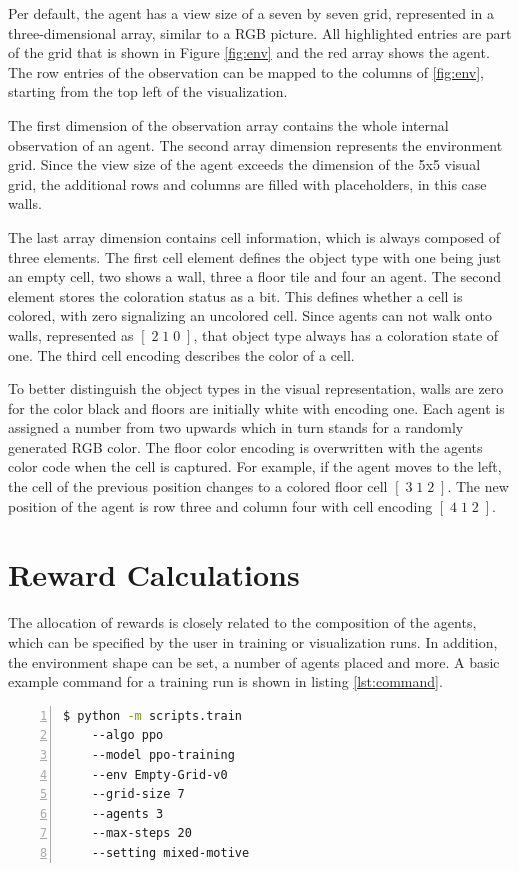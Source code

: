 Per default, the agent has a view size of a seven by seven grid, represented in a three-dimensional array, similar to a RGB picture. All highlighted entries are part of the grid that is shown in Figure \ref{fig:env} and the red array shows the agent. The row entries of the observation can be mapped to the columns of \ref{fig:env}, starting from the top left of the visualization. 

The first dimension of the observation array contains the whole internal observation of an agent. The second array dimension represents the environment grid. Since the view size of the agent exceeds the dimension of the 5x5 visual grid, the additional rows and columns are filled with placeholders, in this case walls.

The last array dimension contains cell information, which is always composed of three elements. The first cell element defines the object type with one being just an empty cell, two shows a wall, three a floor tile and four an agent. The second element stores the coloration status as a bit. This defines whether a cell is colored, with zero signalizing an uncolored cell. Since agents can not walk onto walls, represented as $[\;2\;1\;0\;]$, that object type always has a coloration state of one. The third cell encoding describes the color of a cell. 

To better distinguish the object types in the visual representation, walls are zero for the color black and floors are initially white with encoding one. Each agent is assigned a number from two upwards which in turn stands for a randomly generated RGB color. The floor color encoding is overwritten with the agents color code when the cell is captured. For example, if the agent moves to the left, the cell of the previous position changes to a colored floor cell $[\;3\;1\;2\;]$. The new position of the agent is row three and column four with cell encoding $[\;4\;1\;2\;]$.

\section{Reward Calculations}\label{reward_calculations}
The allocation of rewards is closely related to the composition of the agents, which can be specified by the user in training or visualization runs. In addition, the environment shape can be set, a number of agents placed and more. A basic example command for a training run is shown in listing \ref{lst:command}.

\begin{lstlisting}[float=htp,caption=Exemplary command to execute training with three agents in a coloring environment using PPO as algorithm,label=lst:command,language=bash, numbers=left, numberstyle=\tiny, numbersep=8pt ,xleftmargin=3ex,xrightmargin=1ex]
$ python -m scripts.train
    --algo ppo
    --model ppo-training
    --env Empty-Grid-v0 
    --grid-size 7
    --agents 3 
    --max-steps 20
    --setting mixed-motive
\end{lstlisting}

